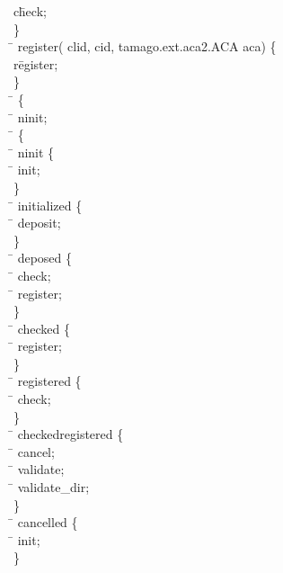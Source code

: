 \begin{program}
\>  \>   c\= heck;\\
\>  \}\\
\>  \=     register(  clid,   cid, tamago.ext.aca2.ACA aca) \{\\
\>  \>   r\= egister;\\
\>  \}\\
\>  \=   \{\\
\>  \>  \=    ninit;\\
\>  \>  \=   \{\\
\>  \>  \>  \=   ninit \{\\
\>  \>  \>  \>  \=    init;\\
\>  \>  \>  \}\\
\>  \>  \>  \=   initialized \{\\
\>  \>  \>  \>  \=    deposit;\\
\>  \>  \>  \}\\
\>  \>  \>  \=   deposed \{\\
\>  \>  \>  \>  \=    check;\\
\>  \>  \>  \>  \=    register;\\
\>  \>  \>  \}\\
\>  \>  \>  \=   checked \{\\
\>  \>  \>  \>  \=    register;\\
\>  \>  \>  \}\\
\>  \>  \>  \=   registered \{\\
\>  \>  \>  \>  \=    check;\\
\>  \>  \>  \}\\
\>  \>  \>  \=   checkedregistered \{\\
\>  \>  \>  \>  \=    cancel;\\
\>  \>  \>  \>  \=    validate;\\
\>  \>  \>  \>  \=    validate_dir;\\
\>  \>  \>  \}\\
\>  \>  \>  \=   cancelled \{\\
\>  \>  \>  \>  \=    init;\\
\>  \>  \>  \}\\

\end{program}
